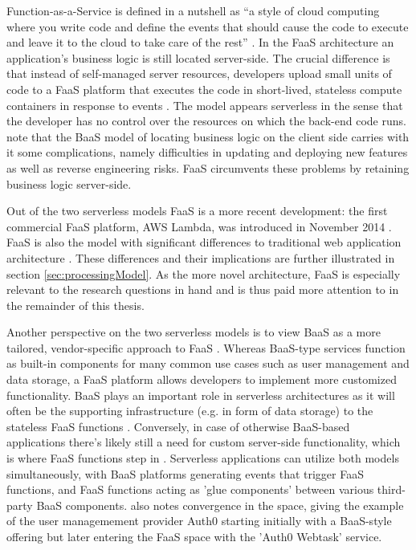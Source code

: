 Function-as-a-Service is defined in a nutshell as ``a style of cloud computing where you write code and define the events that should cause the code to execute and leave it to the cloud to take care of the rest'' \parencite{gannon17cloudNative}. In the FaaS architecture an application's business logic is still located server-side. The crucial difference is that instead of self-managed server resources, developers upload small units of code to a FaaS platform that executes the code in short-lived, stateless compute containers in response to events \parencite{robert2016serverlessarchitectures}. The model appears serverless in the sense that the developer has no control over the resources on which the back-end code runs. \textcite{albuquerque17faaspaas} note that the BaaS model of locating business logic on the client side carries with it some complications, namely difficulties in updating and deploying new features as well as reverse engineering risks. FaaS circumvents these problems by retaining business logic server-side.

Out of the two serverless models FaaS is a more recent development: the first commercial FaaS platform, AWS Lambda, was introduced in November 2014 \parencite{awslambda0218}.
FaaS is also the model with significant differences to traditional web application architecture \parencite{robert2016serverlessarchitectures}. These differences and their implications are further illustrated in section \ref{sec:processingModel}. As the more novel architecture, FaaS is especially relevant to the research questions in hand and is thus paid more attention to in the remainder of this thesis.

Another perspective on the two serverless models is to view BaaS as a more tailored, vendor-specific approach to FaaS \parencite{van2017spec}. Whereas BaaS-type services function as built-in components for many common use cases such as user management and data storage, a FaaS platform allows developers to implement more customized functionality. BaaS plays an important role in serverless architectures as it will often be the supporting infrastructure (e.g. in form of data storage) to the stateless FaaS functions \parencite{cncf18serverlessWG}. Conversely, in case of otherwise BaaS-based applications there's likely still a need for custom server-side functionality, which is where FaaS functions step in \parencite{robert2016serverlessarchitectures}. Serverless applications can utilize both models simultaneously, with BaaS platforms generating events that trigger FaaS functions, and FaaS functions acting as 'glue components' between various third-party BaaS components. \textcite{robert2016serverlessarchitectures} also notes convergence in the space, giving the example of the user managemement provider Auth0 starting initially with a BaaS-style offering but later entering the FaaS space with the 'Auth0 Webtask' service.

